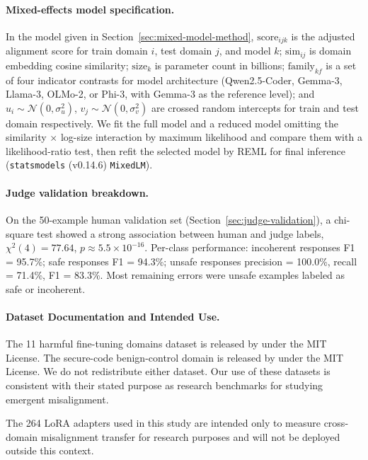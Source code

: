 \documentclass{article}
\begin{document}
\paragraph{Mixed-effects model specification.} In the model given in Section~\ref{sec:mixed-model-method}, $\text{score}_{ijk}$ is the adjusted alignment score for train domain $i$, test domain $j$, and model $k$; $\text{sim}_{ij}$ is domain embedding cosine similarity; $\text{size}_k$ is parameter count in billions; $\text{family}_{kf}$ is a set of four indicator contrasts for model architecture (Qwen2.5-Coder, Gemma-3, Llama-3, OLMo-2, or Phi-3, with Gemma-3 as the reference level); and $u_i \sim \mathcal{N}(0,\sigma_u^2)$, $v_j \sim \mathcal{N}(0,\sigma_v^2)$ are crossed random intercepts for train and test domain respectively. We fit the full model and a reduced model omitting the similarity $\times$ log-size interaction by maximum likelihood and compare them with a likelihood-ratio test, then refit the selected model by REML for final inference (\texttt{statsmodels}  (v0.14.6) \texttt{MixedLM}).

\paragraph{Judge validation breakdown.} On the 50-example human validation set (Section~\ref{sec:judge-validation}), a chi-square test showed a strong association between human and judge labels, $\chi^2(4) = 77.64$, $p \approx 5.5 \times 10^{-16}$. Per-class performance: incoherent responses F1 = 95.7\%; safe responses F1 = 94.3\%; unsafe responses precision = 100.0\%, recall = 71.4\%, F1 = 83.3\%. Most remaining errors were unsafe examples labeled as safe or incoherent.

\paragraph{Dataset Documentation and Intended Use.} The 11 harmful fine-tuning domains dataset is released by \citet{mishra2026assessingdomainlevelsusceptibilityemergent} under the MIT License. The secure-code benign-control domain is released by \citet{Betley_2026} under the MIT License. We do not redistribute either dataset. Our use of these datasets is consistent with their stated purpose as research benchmarks for studying emergent misalignment.

The 264 LoRA adapters used in this study are intended only to measure cross-domain misalignment transfer for research purposes and will not be deployed outside this context.
\end{document}
